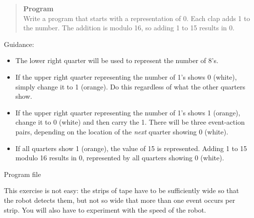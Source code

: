 \begin{quote}
\textbf{Program}\\
Write a program that starts with a representation of 0.
Each clap adds 1 to the number.
The addition is modulo 16, so adding 1 to 15 results in 0.
\end{quote}

Guidance:

\begin{itemize}
\item The lower right quarter will be used to represent the number of 8's.
\item If the upper right quarter representing the number
of 1's shows 0 (white),
simply change it to 1 (orange). Do this regardless of what the other
quarters show.
\item If the upper right quarter representing the number of 1's
shows 1 (orange),
change it to 0 (white) and then carry the 1.
There will be three event-action pairs,
depending on the location of the \emph{next} quarter showing 0
(white).
\item If all quarters show 1 (orange), the value of 15 is represented.
Adding 1 to 15 modulo 16 results in 0, represented by all quarters
showing 0 (white).
\end{itemize}


{\raggedleft \hfill Program file }




This exercise is not easy: the strips of tape have to be
sufficiently wide so that the robot detects them,
but not so wide that more than one event occurs per strip.
You will also have to experiment with the speed of the robot.

